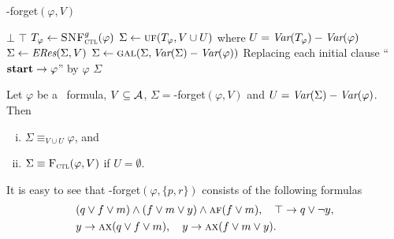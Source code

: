 \documentclass[twoside,11pt]{article}
\begin{document}
\begin{algorithm}[tb]
	\caption{{\CTL-forget}$(\varphi, V)$}
	\label{alg:compute:forgetting:by:Resolution}
	\LinesNumbered
	\lIf{$\varphi\equiv\bot$} {{\bf \Return $\bot$}\;}
	 {{\bf \Return  $\top$}\;}
    $T_\varphi \leftarrow {\textsc{SNF}_{\textsc{ctl}}^g}(\varphi)$ 
    $\Sigma\leftarrow \textsc{uf}(T_\varphi,V\cup U)$ where $U=\textit{Var}(T_\varphi)-\textit{Var}(\varphi)$
    $\Sigma\leftarrow \emph{ERes}(\Sigma,V)$ 
    $\Sigma\leftarrow \textsc{gal}(\Sigma,\textit{Var}(\Sigma)-\textit{Var}(\varphi))$ 
    Replacing each initial clause ``$\textbf{start}\rightarrow\varphi$'' by $\varphi$\;
    \Return $\Sigma$\;
\end{algorithm}



\begin{theorem}\label{thm:soundness:forget:algorithm}
  Let $\varphi$ be a \CTL\ formula, $V\subseteq\cal A$, $\Sigma=$\CTL-forget$(\varphi,V)$  and $U=\textit{Var}(\Sigma)-\textit{Var}(\varphi)$. Then
  \begin{enumerate}[(i)]
   \item $\Sigma\equiv_{V\cup U}\varphi$, and 
   \item $\Sigma\equiv{\textsc{F}_{\textsc{ctl}}}(\varphi,V)$ if $U=\emptyset$.
  \end{enumerate}
\end{theorem}


\begin{example}\label{examp:forget:algorithm}
 It is easy to see that \CTL-forget$(\varphi,\{p,r\})$ consists of the following formulas
  	\begin{align*}%
	&  (q \vee f \vee m)\land (f \vee m \vee y)\land\ALL \FUTURE (f \vee m), \quad \top \rto q\vee\neg y,  \\
    &  y \rto \ALL\NEXT(q \vee f\vee m), \quad y \rto \ALL\NEXT(f\vee m\vee y).
	\end{align*}
\end{example}
\end{document}
